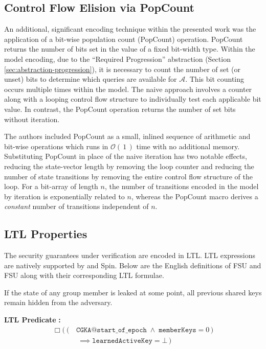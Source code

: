 \documentclass[authordraft,sigconf]{acmart}
\newcommand{\Abrev}[1]{\gls{#1}}
\newcommand{\Adversary}{\ensuremath{\mathcal{A}}\xspace}
\newcommand{\BigO}[1]{\ensuremath{\mathcal{O}\left(\,#1\,\right)}\xspace}
\begin{document}
\subsection{Control Flow Elision via PopCount\label{sec:popcount}}

An additional, significant \Promela encoding technique within the presented work was the application of a bit-wise population count (PopCount) operation.
PopCount returns the number of bits set in the value of a fixed bit-width type.
Within the model encoding, due to the ``Required Progression''  abstraction (Section \ref{sec:abstraction-progression}), it is necessary to count the number of set (or unset) bits to determine which queries are available for \Adversary.
This bit counting occurs multiple times within the model.
The naive approach involves a counter along with a looping control flow structure to individually test each applicable bit value.
In contrast, the PopCount operation returns the number of set bits without iteration.

The authors included PopCount as a small, inlined sequence of arithmetic and bit-wise operations which runs in \BigO{1} time with no additional memory.
Substituting PopCount in place of the naive iteration has two notable effects, reducing the state-vector length by removing the loop counter and reducing the number of state transitions by removing the entire control flow structure of the loop.
For a bit-array of length $n$, the number of transitions encoded in the model by iteration is exponentially related to $n$, whereas the PopCount macro derives a \emph{constant} number of transitions independent of $n$.

\subsection{LTL Properties}

The security guarantees under verification are encoded in \Abrev{LTL}.
\Abrev{LTL} expressions are natively supported by \Promela and Spin.
Below are the English definitions of \Abrev{FSU} and \Abrev{FSU} along with their corresponding \Abrev{LTL} formulae.

\begin{definition}
If the state of any group member is leaked at some point, all previous shared keys remain hidden from the adversary.
\end{definition}%
\noindent\textbf{LTL Predicate} \textbf{:}%
{\small%
\begin{align*}
\Box \Big(~(\, &\texttt{CGKA@start\_of\_epoch}\;\land\;\texttt{memberKeys} = 0 \,)\\
&~\implies \texttt{learnedActiveKey} = \bot \, \Big)
\end{align*}
}
\end{document}
